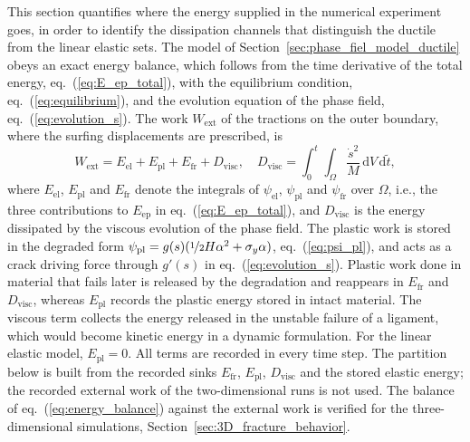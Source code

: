 \documentclass[pdflatex,sn-mathphys-num]{sn-jnl}%
\theoremstyle{thmstyleone}%
\theoremstyle{thmstyletwo}%
\theoremstyle{thmstylethree}%
\begin{document}
This section quantifies where the energy supplied in the numerical experiment goes, in order to identify the dissipation channels that distinguish the ductile from the linear elastic sets. The model of Section~\ref{sec:phase_fiel_model_ductile} obeys an exact energy balance, which follows from the time derivative of the total energy, eq.~(\ref{eq:E_ep_total}), with the equilibrium condition, eq.~(\ref{eq:equilibrium}), and the evolution equation of the phase field, eq.~(\ref{eq:evolution_s}). The work $W_{\text{ext}}$ of the tractions on the outer boundary, where the surfing displacements are prescribed, is
\begin{equation}
    W_{\text{ext}} = E_{\text{el}} + E_{\text{pl}} + E_{\text{fr}} + D_{\text{visc}},
    \quad
    D_{\text{visc}} = \int_0^t \int_\Omega \dfrac{\dot{s}^2}{M}\,\mathrm{d}V\,\mathrm{d}\tilde{t},
    \label{eq:energy_balance}
\end{equation}
where $E_{\text{el}}$, $E_{\text{pl}}$ and $E_{\text{fr}}$ denote the integrals of $\psi_{\text{el}}$, $\psi_{\text{pl}}$ and $\psi_{\text{fr}}$ over $\Omega$, i.e., the three contributions to $E_{\text{ep}}$ in eq.~(\ref{eq:E_ep_total}), and $D_{\text{visc}}$ is the energy dissipated by the viscous evolution of the phase field. The plastic work is stored in the degraded form $\psi_{\text{pl}} = g(s)(\nicefrac{1}{2}H\alpha^2 + \sigma_y\alpha)$, eq.~(\ref{eq:psi_pl}), and acts as a crack driving force through $g'(s)$ in eq.~(\ref{eq:evolution_s}). Plastic work done in material that fails later is released by the degradation and reappears in $E_{\text{fr}}$ and $D_{\text{visc}}$, whereas $E_{\text{pl}}$ records the plastic energy stored in intact material. The viscous term collects the energy released in the unstable failure of a ligament, which would become kinetic energy in a dynamic formulation. For the linear elastic model, $E_{\text{pl}} = 0$. All terms are recorded in every time step. The partition below is built from the recorded sinks $E_{\text{fr}}$, $E_{\text{pl}}$, $D_{\text{visc}}$ and the stored elastic energy; the recorded external work of the two-dimensional runs is not used. The balance of eq.~(\ref{eq:energy_balance}) against the external work is verified for the three-dimensional simulations, Section~\ref{sec:3D_fracture_behavior}.
\end{document}
